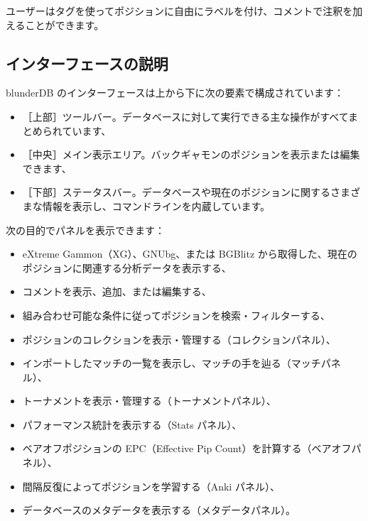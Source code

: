\documentclass[letterpaper,10pt,dvipdfmx]{sphinxmanual}
\begin{document}
\sphinxAtStartPar
ユーザーはタグを使ってポジションに自由にラベルを付け、コメントで注釈を加えることができます。


\subsection{インターフェースの説明}
\label{\detokenize{manuel:description-de-l-interface}}
\sphinxAtStartPar
blunderDB のインターフェースは上から下に次の要素で構成されています：
\begin{itemize}
\item {} 
\sphinxAtStartPar
［上部］ツールバー。データベースに対して実行できる主な操作がすべてまとめられています、

\item {} 
\sphinxAtStartPar
［中央］メイン表示エリア。バックギャモンのポジションを表示または編集できます、

\item {} 
\sphinxAtStartPar
［下部］ステータスバー。データベースや現在のポジションに関するさまざまな情報を表示し、コマンドラインを内蔵しています。

\end{itemize}

\sphinxAtStartPar
次の目的でパネルを表示できます：
\begin{itemize}
\item {} 
\sphinxAtStartPar
eXtreme Gammon（XG）、GNUbg、または BGBlitz から取得した、現在のポジションに関連する分析データを表示する、

\item {} 
\sphinxAtStartPar
コメントを表示、追加、または編集する、

\item {} 
\sphinxAtStartPar
組み合わせ可能な条件に従ってポジションを検索・フィルターする、

\item {} 
\sphinxAtStartPar
ポジションのコレクションを表示・管理する（コレクションパネル）、

\item {} 
\sphinxAtStartPar
インポートしたマッチの一覧を表示し、マッチの手を辿る（マッチパネル）、

\item {} 
\sphinxAtStartPar
トーナメントを表示・管理する（トーナメントパネル）、

\item {} 
\sphinxAtStartPar
パフォーマンス統計を表示する（Stats パネル）、

\item {} 
\sphinxAtStartPar
ベアオフポジションの EPC（Effective Pip Count）を計算する（ベアオフパネル）、

\item {} 
\sphinxAtStartPar
間隔反復によってポジションを学習する（Anki パネル）、

\item {} 
\sphinxAtStartPar
データベースのメタデータを表示する（メタデータパネル）。

\end{itemize}
\end{document}
